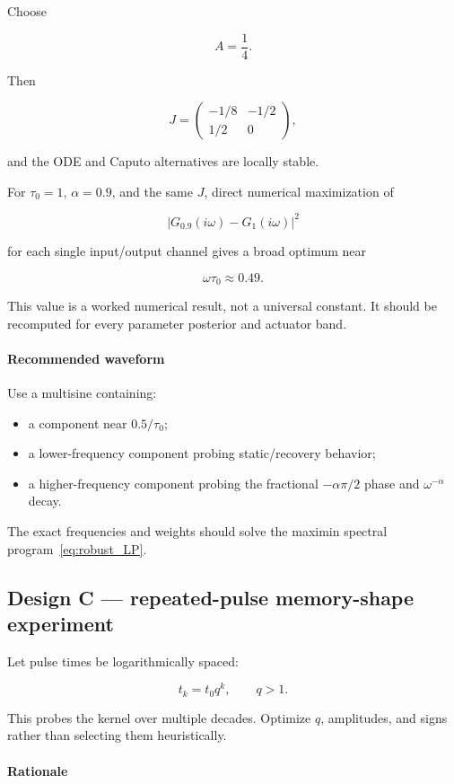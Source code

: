 Choose

\[
A=\frac14.
\]

Then

\[
J=\begin{pmatrix}-1/8&-1/2\\1/2&0\end{pmatrix},
\]

and the ODE and Caputo alternatives are locally stable.

For \(\tau_0=1\), \(\alpha=0.9\), and the same \(J\), direct numerical maximization of

\[
|G_{0.9}(i\omega)-G_1(i\omega)|^2
\]

for each single input/output channel gives a broad optimum near

\[
\boxed{\omega\tau_0\approx0.49.}
\]

This value is a worked numerical result, not a universal constant. It should be recomputed for every parameter posterior and actuator band.

\paragraph{Recommended waveform}

Use a multisine containing:
\begin{itemize}
\item a component near \(0.5/\tau_0\);
\item a lower-frequency component probing static/recovery behavior;
\item a higher-frequency component probing the fractional \(-\alpha\pi/2\) phase and \(\omega^{-\alpha}\) decay.
\end{itemize}
The exact frequencies and weights should solve the maximin spectral program~\eqref{eq:robust_LP}.

\subsection{Design C --- repeated-pulse memory-shape experiment}

Let pulse times be logarithmically spaced:

\[
t_k=t_0q^k,
\qquad q>1.
\]

This probes the kernel over multiple decades. Optimize \(q\), amplitudes, and signs rather than selecting them heuristically.

\paragraph{Rationale}

